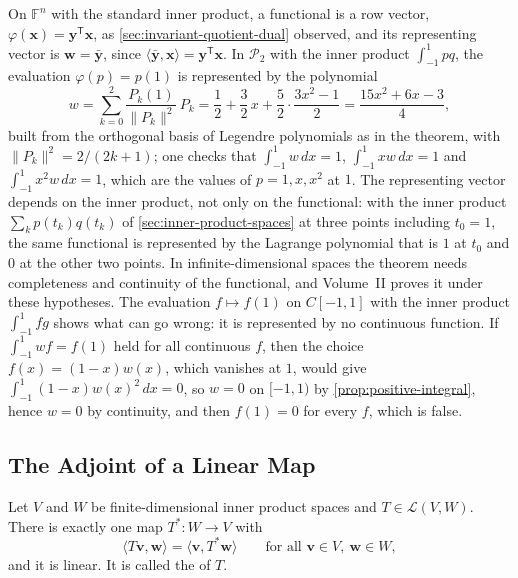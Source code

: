 On $\mathbb F^n$ with the standard inner product, a functional is a row vector, $\varphi(\mathbf x)=\mathbf y^{\mathsf T}\mathbf x$, as \cref{sec:invariant-quotient-dual} observed, and its representing vector is $\mathbf w=\bar{\mathbf y}$, since $\langle\bar{\mathbf y},\mathbf x\rangle=\mathbf y^{\mathsf T}\mathbf x$. In $\mathcal P_2$ with the inner product $\int_{-1}^1pq$, the evaluation $\varphi(p)=p(1)$ is represented by the polynomial
\[
w=\sum_{k=0}^2\frac{P_k(1)}{\|P_k\|^2}\,P_k=\frac12+\frac32\,x+\frac52\cdot\frac{3x^2-1}2=\frac{15x^2+6x-3}4 ,
\]
built from the orthogonal basis of Legendre polynomials as in the theorem, with $\|P_k\|^2=2/(2k+1)$; one checks that $\int_{-1}^1w\,dx=1$, $\int_{-1}^1xw\,dx=1$ and $\int_{-1}^1x^2w\,dx=1$, which are the values of $p=1,x,x^2$ at $1$. The representing vector depends on the inner product, not only on the functional: with the inner product $\sum_kp(t_k)q(t_k)$ of \cref{sec:inner-product-spaces} at three points including $t_0=1$, the same functional is represented by the Lagrange polynomial that is $1$ at $t_0$ and $0$ at the other two points. In infinite-dimensional spaces the theorem needs completeness and continuity of the functional, and Volume~II proves it under these hypotheses. The evaluation $f\mapsto f(1)$ on $C[-1,1]$ with the inner product $\int_{-1}^1fg$ shows what can go wrong: it is represented by no continuous function. If $\int_{-1}^1wf=f(1)$ held for all continuous $f$, then the choice $f(x)=(1-x)w(x)$, which vanishes at $1$, would give $\int_{-1}^1(1-x)w(x)^2\,dx=0$, so $w=0$ on $[-1,1)$ by \cref{prop:positive-integral}, hence $w=0$ by continuity, and then $f(1)=0$ for every $f$, which is false.

\subsection{The Adjoint of a Linear Map}

\begin{theorem}[Adjoint]
\label{thm:adjoint}
Let $V$ and $W$ be finite-dimensional inner product spaces and $T\in\mathcal L(V,W)$. There is exactly one map $T^*\colon W\to V$ with
\[
\langle T\mathbf v,\mathbf w\rangle=\langle\mathbf v,T^*\mathbf w\rangle\qquad\text{for all }\mathbf v\in V,\ \mathbf w\in W,
\]
and it is linear. It is called the  of $T$.
\end{theorem}

